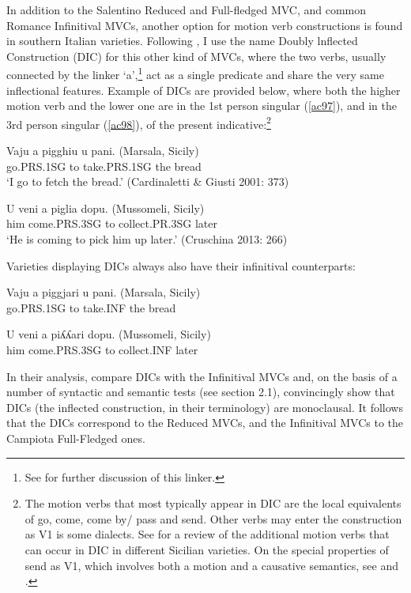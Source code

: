 \documentclass[output=paper]{langscibook}
\begin{document}
In addition to the Salentino Reduced and Full-fledged MVC, and common Romance Infinitival MVCs, another option for motion verb constructions is found in southern Italian varieties. Following \cite{cruschina2013a}, I use the name Doubly lnflected Construction (DIC) for this other kind of MVCs, where the two verbs, usually connected by the linker ‘a’,\footnote{See \cite{calabrese2021a} for further discussion of this linker.}  act as a single predicate and share the very same inflectional features. Example of DICs are provided below, where both the higher motion verb and the lower one are in the 1st person singular (\ref{ac97}), and in the 3rd person singular (\ref{ac98}), of the present indicative:\footnote{The motion verbs that most typically appear in DIC are the local equivalents of go, come, come by/ pass and send. Other verbs may enter the construction as V1 is some dialects. See \cite{caro2018a, caro2019a} for a review of the additional motion verbs that can occur in DIC in different Sicilian varieties. On the special properties of send as V1, which involves both a motion and a causative semantics, see \cite{todaro2018a} and \cite{prete2020a}.}

\ea \label{ac97}
\gll Vaju    a   pigghiu    u   pani.    (Marsala, Sicily)\\
   go.PRS.1SG to   take.PRS.1SG  the  bread \\
 \glt  ‘I go to fetch the bread.’ \hfill (Cardinaletti \& Giusti 2001: 373)
\z

\ea \label{ac98}\gll  U   veni      a  piglia   dopu.      (Mussomeli, Sicily)\\
   him  come.PRS.3SG  to  collect.PR.3SG later\\
\glt   ‘He is coming to pick him up later.’ \hfill  (Cruschina 2013: 266)
\z

Varieties displaying DICs always also have their infinitival counterparts:

\ea \label{ac99}\gll Vaju    a  piggjari u     pani.    (Marsala, Sicily)\\
go.PRS.1SG to  take.INF the    bread \\
\z
   
\ea \label{ac100}\gll U   veni      a   piʎʎari   dopu.   (Mussomeli, Sicily)\\
him  come.PRS.3SG to   collect.INF later\\
\z

In their analysis, \cite{cardinaletti2001a} compare DICs with the Infinitival MVCs and, on the basis of a number of syntactic and semantic tests (see section 2.1), convincingly show that DICs (the inflected construction, in their terminology) are monoclausal. It follows that the DICs correspond to the Reduced MVCs, and the Infinitival MVCs to the Campiota Full-Fledged ones.
\end{document}
